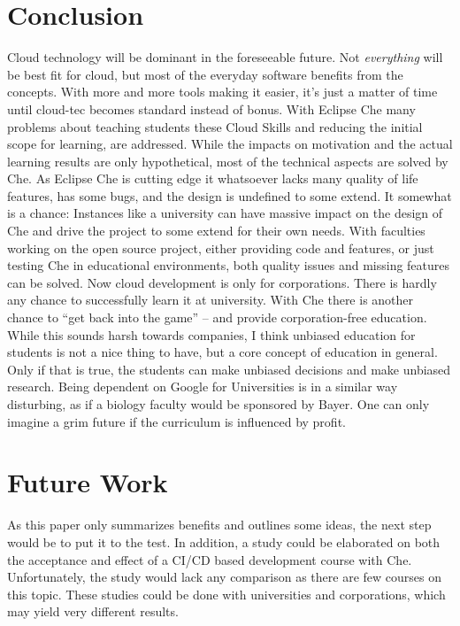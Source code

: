 \documentclass[utf8]{lni}
\begin{document}
\section{Conclusion}
\label{sec:Conclusion}
Cloud technology will be dominant in the foreseeable future. 
Not \textit{everything} will be best fit for cloud, but most of the everyday software benefits from the concepts. 
With more and more tools making it easier, it's just a matter of time until cloud-tec becomes standard instead of bonus.
With Eclipse Che many problems about teaching students these Cloud Skills and reducing the initial scope for learning, are addressed. 
While the impacts on motivation and the actual learning results are only hypothetical, most of the technical aspects are solved by Che.  
As Eclipse Che is cutting edge it whatsoever lacks many quality of life features, has some bugs, and the design is undefined to some extend. 
It somewhat is a chance: 
Instances like a university can have massive impact on the design of Che and drive the project to some extend for their own needs. 
With faculties working on the open source project, either providing code and features, or just testing Che in educational environments, both quality issues and missing features can be solved.    
Now cloud development is only for corporations. 
There is hardly any chance to successfully learn it at university. 
With Che there is another chance to “get back into the game” – and provide corporation-free education.  
While this sounds harsh towards companies, I think unbiased education for students is not a nice thing to have, but a core concept of education in general. 
Only if that is true, the students can make unbiased decisions and make unbiased research. 
Being dependent on Google for Universities is in a similar way disturbing, as if a biology faculty would be sponsored by Bayer. 
One can only imagine a grim future if the curriculum is influenced by profit. 
\section*{Future Work}
\label{sec:FutureWork}
As this paper only summarizes benefits and outlines some ideas, the next step would be to put it to the test.
In addition, a study could be elaborated on both the acceptance and effect of a CI/CD based development course with Che. 
Unfortunately, the study would lack any comparison as there are few courses on this topic. 
These studies could be done with universities and corporations, which 
may yield very different results.   


\end{document}
